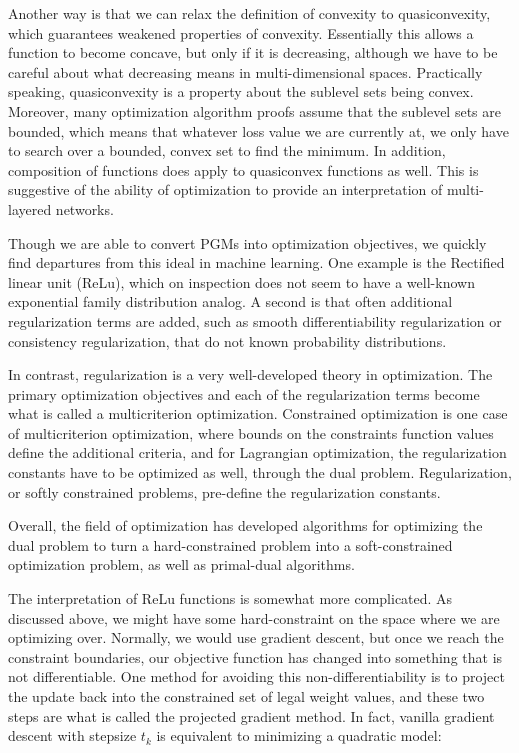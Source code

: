\documentclass[a4paper]{article}
\begin{document}
Another way is that we can relax the definition of convexity to quasiconvexity, which guarantees weakened properties of convexity. 
Essentially this allows a function to become concave, but only if it is decreasing, although we have to be careful about what decreasing means in multi-dimensional spaces. 
Practically speaking, quasiconvexity is a property about the sublevel sets being convex. 
Moreover, many optimization algorithm proofs assume that the sublevel sets are bounded, which means that whatever loss value we are currently at, we only have to search over a bounded, convex set to find the minimum.
In addition, composition of functions does apply to quasiconvex functions as well. This is suggestive of the ability of optimization to provide an interpretation of multi-layered networks. 

Though we are able to convert PGMs into optimization objectives, we quickly find departures from this ideal in machine learning. 
One example is the Rectified linear unit (ReLu), which on inspection does not seem to have a well-known exponential family distribution analog. 
A second is that often additional regularization terms are added, such as smooth differentiability regularization or consistency regularization, that do not known probability distributions. 

In contrast, regularization is a very well-developed theory in optimization. 
The primary optimization objectives and each of the regularization terms become what is called a multicriterion optimization. 
Constrained optimization is one case of multicriterion optimization, where bounds on the constraints function values define the additional criteria, and for Lagrangian optimization, the regularization constants have to be optimized as well, through the dual problem. 
Regularization, or softly constrained problems, pre-define the regularization constants.

Overall, the field of optimization has developed algorithms for optimizing the dual problem to turn a hard-constrained problem into a soft-constrained optimization problem, as well as primal-dual algorithms. 

The interpretation of ReLu functions is somewhat more complicated. 
As discussed above, we might have some hard-constraint on the space where we are optimizing over. 
Normally, we would use gradient descent, but once we reach the constraint boundaries, our objective function has changed into something that is not differentiable. 
One method for avoiding this non-differentiability is to project the update back into the constrained set of legal weight values, and these two steps are what is called the projected gradient method. 
In fact, vanilla gradient descent with stepsize $t_k$ is equivalent to minimizing a quadratic model:
\end{document}
